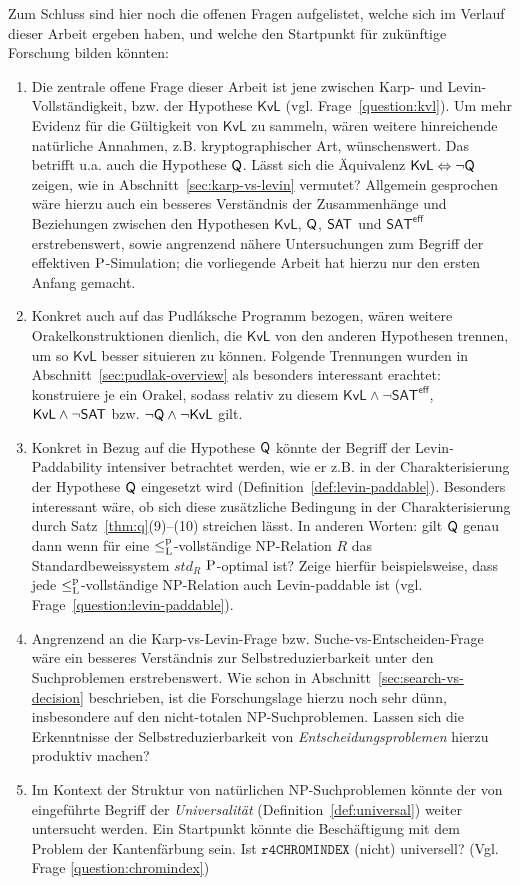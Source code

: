 Zum Schluss sind hier noch die offenen Fragen aufgelistet, welche sich im Verlauf dieser Arbeit ergeben haben, und welche den Startpunkt für zukünftige Forschung bilden könnten:
\begin{enumerate}[label=\arabic*.,midpenalty=0]
    \item Die zentrale offene Frage dieser Arbeit ist jene zwischen Karp- und Levin-Vollständigkeit, bzw. der Hypothese $\mathsf{KvL}$ (vgl. Frage~\ref{question:kvl}). Um mehr Evidenz für die Gültigkeit von $\mathsf{KvL}$ zu sammeln, wären weitere hinreichende natürliche Annahmen, z.B. kryptographischer Art, wünschenswert.
        Das betrifft u.a. auch die Hypothese $\hQ$. Lässt sich die Äquivalenz $\mathsf{KvL}\Leftrightarrow \neg\hQ$ zeigen, wie in Abschnitt~\ref{sec:karp-vs-levin} vermutet?
        Allgemein gesprochen wäre hierzu auch ein besseres Verständnis der Zusammenhänge und Beziehungen zwischen den Hypothesen $\mathsf{KvL}$, $\hQ$, $\hSAT$ und $\mathsf{SAT^{eff}}$ erstrebenswert, sowie angrenzend nähere Untersuchungen zum Begriff der effektiven $\P$-Simulation; die vorliegende Arbeit hat hierzu nur den ersten Anfang gemacht.

    \item Konkret auch auf das Pudláksche Programm bezogen, wären weitere Orakelkonstruktionen dienlich, die $\mathsf{KvL}$ von den anderen Hypothesen trennen, um so $\mathsf{KvL}$ besser situieren zu können. Folgende Trennungen wurden in Abschnitt~\ref{sec:pudlak-overview} als besonders interessant erachtet: konstruiere je ein Orakel, sodass relativ zu diesem $\mathsf{KvL}\land\neg\mathsf{SAT^{eff}}$, $\mathsf{KvL}\land\neg\hSAT$ bzw. $\neg\hQ\land\neg\mathsf{KvL}$ gilt.
    \item Konkret in Bezug auf die Hypothese $\hQ$ könnte der Begriff der Levin-Paddability intensiver betrachtet werden, wie er z.B. in der Charakterisierung der Hypothese $\hQ$ eingesetzt wird (Definition~\ref{def:levin-paddable}). Besonders interessant wäre, ob sich diese zusätzliche Bedingung in der Charakterisierung durch Satz~\ref{thm:q}(9)–(10) streichen lässt. In anderen Worten: gilt $\hQ$ genau dann wenn für eine $\leqlp$-vollständige NP-Relation $R$ das Standardbeweissystem $\mathit{std}_R$ $\P$-optimal ist?
        Zeige hierfür beispielsweise, dass jede $\leqlp$-vollständige NP-Relation auch Levin-paddable ist (vgl. Frage~\ref{question:levin-paddable}).
    \item Angrenzend an die Karp-vs-Levin-Frage bzw. Suche-vs-Entscheiden-Frage wäre ein besseres Verständnis zur Selbstreduzierbarkeit unter den Suchproblemen erstrebenswert. Wie schon in Abschnitt~\ref{sec:search-vs-decision} beschrieben, ist die Forschungslage hierzu noch sehr dünn, insbesondere auf den nicht-totalen NP-Suchproblemen. Lassen sich die Erkenntnisse der Selbstreduzierbarkeit von \emph{Entscheidungsproblemen} hierzu produktiv machen?
\item Im Kontext der Struktur von natürlichen NP-Suchproblemen könnte der von \textcite{agrawal_universal_1992} eingeführte Begriff der \emph{Universalität} (Definition~\ref{def:universal}) weiter untersucht werden. Ein Startpunkt könnte die Beschäftigung mit dem Problem der Kantenfärbung sein. Ist $\mathtt{r4CHROMINDEX}$ (nicht) universell? (Vgl. Frage \ref{question:chromindex})
\end{enumerate}
